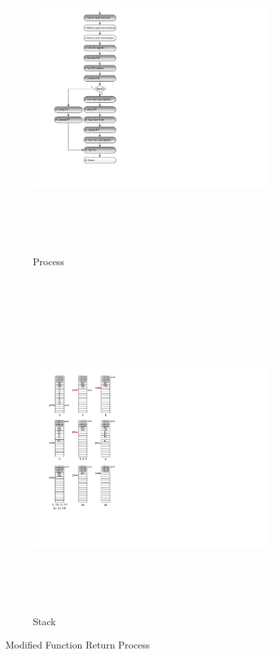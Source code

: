\begin{figure}[h]
        \centering
        \begin{subfigure}[b]{0.5\columnwidth}
                \includegraphics[width=\textwidth, height=12cm]{figures/modified_function_operations_process_post_execution_v2}
                \caption{Process}
                \label{fig:modified_function_operation_process_post_execution}
        \end{subfigure}~
        \begin{subfigure}[b]{0.5\columnwidth}
                \includegraphics[width=\textwidth, height=12cm]{figures/modified_function_operations_stack_post_execution_v2}
                \caption{Stack}
                \label{fig:modified_function_operation_stack_post_execution}
        \end{subfigure}
        \vspace{10pt}
        \caption{Modified Function Return Process}\label{fig:modified_function_operation_post_execution}
\end{figure}
